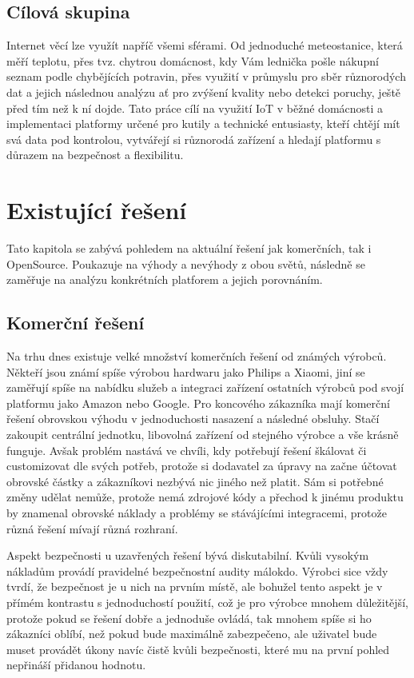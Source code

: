 \subsection{Cílová skupina}
Internet věcí lze využít napříč všemi sférami. Od jednoduché meteostanice, která měří teplotu, přes tvz. chytrou domácnost, kdy Vám lednička pošle nákupní seznam podle chybějících potravin, přes využití v průmyslu pro sběr různorodých dat a jejich následnou analýzu ať pro zvýšení kvality nebo detekci poruchy, ještě před tím než k ní dojde. Tato práce cílí na využití IoT v běžné domácnosti a implementaci platformy určené pro kutily a technické entusiasty, kteří chtějí mít svá data pod kontrolou, vytvářejí si různorodá zařízení a hledají platformu s důrazem na bezpečnost a flexibilitu.


\section{Existující řešení}
Tato kapitola se zabývá pohledem na aktuální řešení jak komerčních, tak i OpenSource. Poukazuje na výhody a nevýhody z obou světů, následně se zaměřuje na analýzu konkrétních platforem a jejich porovnáním.

\subsection{Komerční řešení}
Na trhu dnes existuje velké množství komerčních řešení od známých výrobců. Někteří jsou známí spíše výrobou hardwaru jako Philips a Xiaomi, jiní se zaměřují spíše na nabídku služeb a integraci zařízení ostatních výrobců pod svojí platformu jako Amazon nebo Google. Pro koncového zákazníka mají komerční řešení obrovskou výhodu v jednoduchosti nasazení a následné obsluhy. Stačí zakoupit centrální jednotku, libovolná zařízení od stejného výrobce a vše krásně funguje. Avšak problém nastává ve chvíli, kdy potřebují řešení škálovat či customizovat dle svých potřeb, protože si dodavatel za úpravy na  začne účtovat obrovské částky a zákazníkovi nezbývá nic jiného než platit. Sám si potřebné změny udělat nemůže, protože nemá zdrojové kódy a přechod k jinému produktu by znamenal obrovské náklady a problémy se stávájícími integracemi, protože různá řešení mívají různá rozhraní.

Aspekt bezpečnosti u uzavřených řešení bývá diskutabilní. Kvůli vysokým nákladům provádí pravidelné bezpečnostní audity málokdo. Výrobci sice vždy tvrdí, že bezpečnost je u nich na prvním místě, ale bohužel tento aspekt je v přímém kontrastu s jednoduchostí použití, což je pro výrobce mnohem důležitější, protože pokud se řešení dobře a jednoduše ovládá, tak mnohem spíše si ho zákazníci oblíbí, než pokud bude maximálně zabezpečeno, ale uživatel bude muset provádět úkony navíc čistě kvůli bezpečnosti, které mu na první pohled nepřináší přidanou hodnotu.

